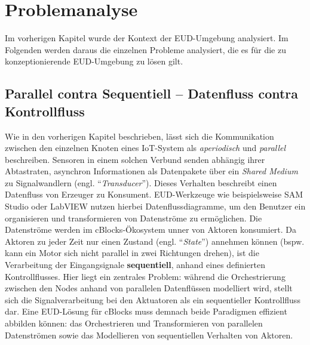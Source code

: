 \section{Problemanalyse}\label{sec:problemanalyse}
Im vorherigen Kapitel wurde der Kontext der \ac{EUD}-Umgebung analysiert. Im Folgenden werden daraus die einzelnen Probleme analysiert, die es für die zu konzeptionierende \ac{EUD}-Umgebung zu lösen gilt.

\subsection{Parallel contra Sequentiell -- Datenfluss contra Kontrollfluss}
Wie in den vorherigen Kapitel beschrieben, lässt sich die Kommunikation zwischen den einzelnen Knoten eines \ac{IoT}-System als \textit{aperiodisch} und \textit{parallel} beschreiben. Sensoren in einem solchen Verbund senden abhängig ihrer Abtastraten, asynchron Informationen als Datenpakete über ein \textit{Shared Medium} zu Signalwandlern (engl. "`\textit{Transducer}"'). Dieses Verhalten beschreibt einen Datenfluss von Erzeuger zu Konsument. \ac{EUD}-Werkzeuge wie beispielsweise SAM Studio oder LabVIEW nutzen hierbei Datenflussdiagramme, um den Benutzer ein organisieren und transformieren von Datenströme zu ermöglichen. Die Datenströme werden im \acp{cBlock}-Ökosystem unner von Aktoren konsumiert. Da Aktoren zu jeder Zeit nur einen Zustand (engl. "`\textit{State}"') annehmen können (bspw. kann ein Motor sich nicht parallel in zwei Richtungen drehen), ist die Verarbeitung der Eingangsignale \textbf{sequentiell}, anhand eines definierten Kontrollflusses. Hier liegt ein zentrales Problem: während die Orchestrierung zwischen den Nodes anhand von parallelen Datenflüssen modelliert wird, stellt sich die Signalverarbeitung bei den Aktuatoren als ein sequentieller Kontrollfluss dar. Eine \ac{EUD}-Lösung für cBlocks muss demnach beide Paradigmen effizient abbilden können: das Orchestrieren und Transformieren von parallelen Datenströmen sowie das Modellieren von sequentiellen Verhalten von Aktoren.

